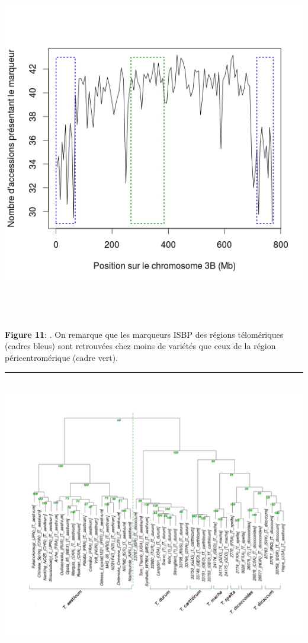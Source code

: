 \documentclass[a4paper, 12pt]{article}
\begin{document}
\begin{onehalfspace}
\newpage
\thispagestyle{empty}
\begin{multicols}{2}
\begin{center}
\vspace{-1cm}
\includegraphics[scale=0.45]{pic_Data/fig10.jpeg}\\
\end{center}
~\\ ~\\ ~\\
\textbf{Figure 11}: . On remarque que les marqueurs ISBP des régions télomériques (cadres bleus) sont retrouvées chez moins de variétés que ceux de la région péricentromérique (cadre vert).\\
\end{multicols}
\vspace{-0.8cm}
\begin{center}
\rule{10cm}{0.2pt}\\
\includegraphics[scale=0.55]{pic_Data/fig11.png}\\

\end{center}
\end{onehalfspace}
\end{document}
